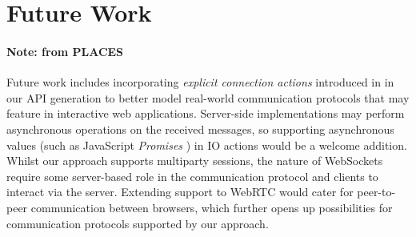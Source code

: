 \section{Future Work}

\paragraph{Note: from PLACES}
Future work includes incorporating \textit{explicit connection actions}
introduced in \cite{ExplicitConnections} in our API generation to better model
real-world communication protocols that may feature in interactive web
applications.
Server-side implementations may perform asynchronous operations on the
received messages, so supporting asynchronous values (such as JavaScript
\textit{Promises} \cite{promise}) in IO actions would be a welcome addition.
Whilst our approach supports multiparty sessions, the nature of
WebSockets require some server-based role in the communication protocol and
clients to interact via the server.
Extending support to WebRTC \cite{WebRTC} would
cater for peer-to-peer communication between browsers, which further opens up
possibilities for communication protocols supported by our approach.